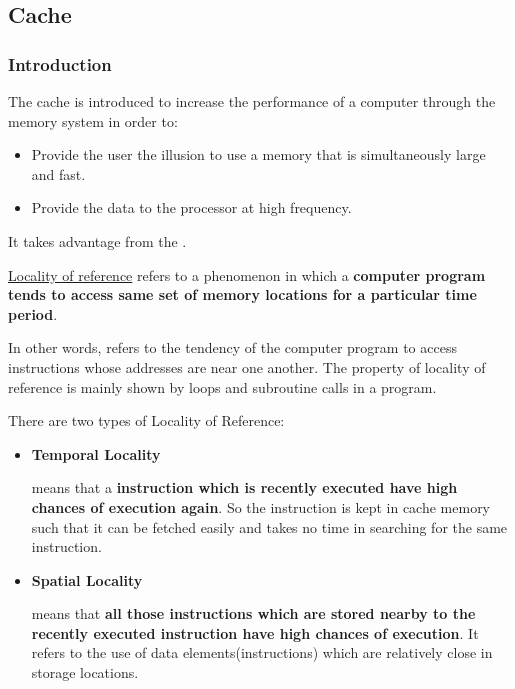 \subsection{Cache}

\subsubsection{Introduction}

The cache is introduced to increase the performance of a computer through the memory system in order to:
\begin{itemize}
    \item Provide the user the illusion to use a memory that is simultaneously large and fast.
    \item Provide the data to the processor at high frequency.
\end{itemize}
It takes advantage from the .

\begin{definitionbox}
    \href{https://www.geeksforgeeks.org/locality-of-reference-and-cache-operation-in-cache-memory/}{Locality of reference} refers to a phenomenon in which a \textbf{computer program tends to access same set of memory locations for a particular time period}. 
    
    In other words,  refers to the tendency of the computer program to access instructions whose addresses are near one another. The property of locality of reference is mainly shown by loops and subroutine calls in a program.
\end{definitionbox}

\noindent
There are two types of Locality of Reference:
\begin{itemize}
    \item \textbf{Temporal Locality}
    \begin{definitionbox}
         means that a \textbf{instruction which is recently executed have high chances of execution again}. So the instruction is kept in cache memory such that it can be fetched easily and takes no time in searching for the same instruction.
    \end{definitionbox}

    \item \textbf{Spatial Locality}
    \begin{definitionbox}
         means that \textbf{all those instructions which are stored nearby to the recently executed instruction have high chances of execution}. It refers to the use of data elements(instructions) which are relatively close in storage locations.
    \end{definitionbox}
\end{itemize}

